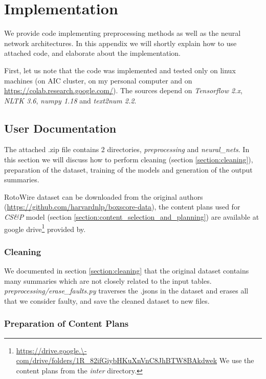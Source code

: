\chapter{Implementation} \label{chapter:appendix_a}

We provide code implementing preprocessing methods as well as the neural network architectures. In this appendix we will shortly explain how to use attached code, and elaborate about the implementation.

First, let us note that the code was implemented and tested only on linux machines (on AIC cluster, on my personal computer and on \url{https://colab.research.google.com/}). The sources depend on \emph{Tensorflow 2.x}, \emph{NLTK 3.6}, \emph{numpy 1.18} and \emph{text2num 2.2}.

\section{User Documentation}

The attached .zip file contains 2 directories, \emph{preprocessing} and \emph{neural\_nets}. In this section we will discuss how to perform cleaning (section \ref{section:cleaning}), preparation of the dataset, training of the models and generation of the output summaries.

RotoWire dataset can be downloaded from the original authors \citep{wiseman2017} (\url{https://github.com/harvardnlp/boxscore-data}), the content plans used for \emph{CS\&P} model (section \ref{section:content_selection_and_planning}) are available at google drive\footnote{\url{https://drive.google.\-com/drive/folders/1R_82ifGiybHKuXnVnC8JhBTW8BAkdwek} We use the content plans from the \emph{inter} directory.} provided by\linebreak\citet{puduppully2019datatotext}.

\subsection{Cleaning}

We documented in section \ref{section:cleaning} that the original dataset contains many summaries which are not closely related to the input tables. \emph{preprocessing/erase\_faults.py} traverses the .jsons in the dataset and erases all that we consider faulty, and save the cleaned dataset to new files.

\subsection{Preparation of Content Plans}

